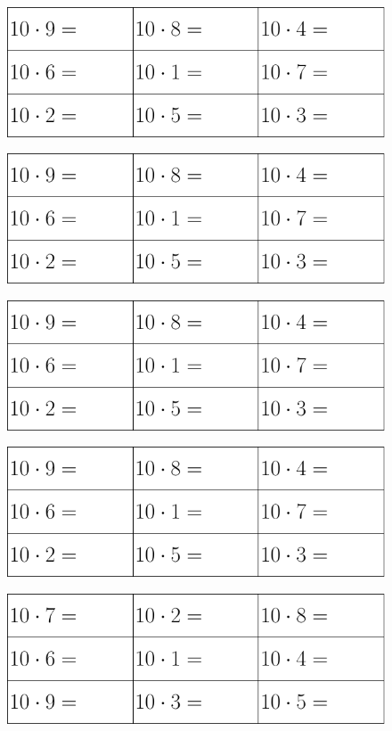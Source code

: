 \begin{figure}
	\includegraphics[]{g10}
\end{figure}
\vs
\begin{figure}
	\includegraphics[]{g10}
\end{figure}		
\vs
\begin{figure}
	\includegraphics[]{g10}
\end{figure}
\vs
\begin{figure}
	\includegraphics[]{g10}
\end{figure}
\newpage		
	 \thispagestyle{empty}
\begin{figure}
	\includegraphics[]{g10a}
\end{figure}

